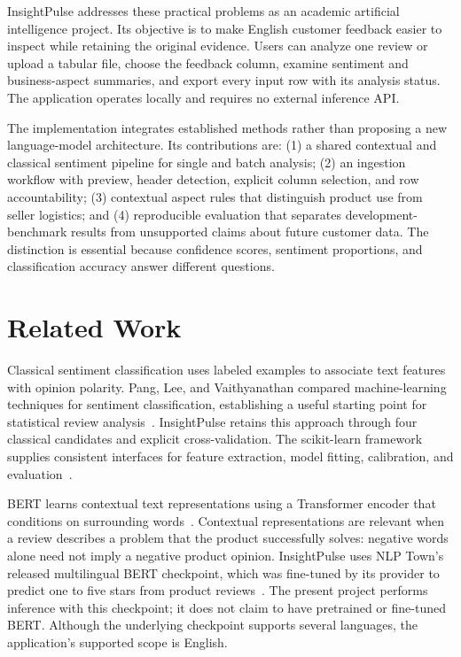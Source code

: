 \documentclass[conference,a4paper]{IEEEtran}
\begin{document}
InsightPulse addresses these practical problems as an academic artificial intelligence project. Its objective is to make English customer feedback easier to inspect while retaining the original evidence. Users can analyze one review or upload a tabular file, choose the feedback column, examine sentiment and business-aspect summaries, and export every input row with its analysis status. The application operates locally and requires no external inference API.

The implementation integrates established methods rather than proposing a new language-model architecture. Its contributions are: (1) a shared contextual and classical sentiment pipeline for single and batch analysis; (2) an ingestion workflow with preview, header detection, explicit column selection, and row accountability; (3) contextual aspect rules that distinguish product use from seller logistics; and (4) reproducible evaluation that separates development-benchmark results from unsupported claims about future customer data. The distinction is essential because confidence scores, sentiment proportions, and classification accuracy answer different questions.

\section{Related Work}
Classical sentiment classification uses labeled examples to associate text features with opinion polarity. Pang, Lee, and Vaithyanathan compared machine-learning techniques for sentiment classification, establishing a useful starting point for statistical review analysis~\cite{pang}. InsightPulse retains this approach through four classical candidates and explicit cross-validation. The scikit-learn framework supplies consistent interfaces for feature extraction, model fitting, calibration, and evaluation~\cite{sklearn}.

BERT learns contextual text representations using a Transformer encoder that conditions on surrounding words~\cite{bert}. Contextual representations are relevant when a review describes a problem that the product successfully solves: negative words alone need not imply a negative product opinion. InsightPulse uses NLP Town's released multilingual BERT checkpoint, which was fine-tuned by its provider to predict one to five stars from product reviews~\cite{nlptown}. The present project performs inference with this checkpoint; it does not claim to have pretrained or fine-tuned BERT. Although the underlying checkpoint supports several languages, the application's supported scope is English.
\end{document}
